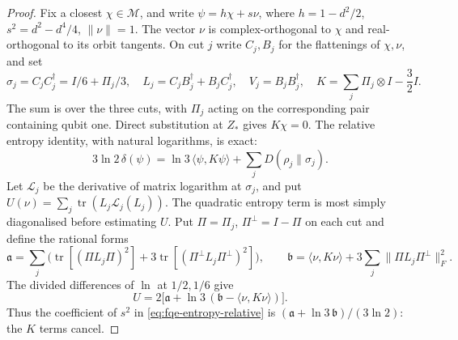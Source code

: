 \begin{proof}
Fix a closest $\chi\in\mathcal M$, and write
$\psi=h\chi+s\nu$, where $h=1-d^2/2$, $s^2=d^2-d^4/4$,
$\|\nu\|=1$. The vector $\nu$ is complex-orthogonal to $\chi$
and real-orthogonal to its orbit tangents. On cut $j$ write $C_j,B_j$
for the flattenings of $\chi,\nu$, and set
\[
 \sigma_j=C_jC_j^\dagger=I/6+\Pi_j/3,\quad
 L_j=C_jB_j^\dagger+B_jC_j^\dagger,\quad
 V_j=B_jB_j^\dagger,\quad
 K=\sum_j\Pi_j\otimes I-\frac32 I.
\]
The sum is over the three cuts, with $\Pi_j$ acting on the corresponding
pair containing qubit one. Direct substitution at $Z_*$ gives $K\chi=0$.
The relative entropy identity, with natural logarithms, is exact:
\begin{equation}\label{eq:fqe-entropy-relative}
 3\ln2\,\delta(\psi)=\ln3\,\langle\psi,K\psi\rangle
                         +\sum_jD(\rho_j\|\sigma_j).
\end{equation}
Let $\mathcal L_j$ be the derivative of matrix logarithm at $\sigma_j$,
and put $U(\nu)=\sum_j\operatorname{tr}(L_j\mathcal L_j(L_j))$.
The quadratic entropy term is most simply diagonalised before estimating
$U$. Put $\Pi=\Pi_j$, $\Pi^\perp=I-\Pi$ on each cut and define the rational forms
\[
 \mathfrak a=\sum_j\bigl(\operatorname{tr}[(\Pi L_j\Pi)^2]
                         +3\operatorname{tr}[(\Pi^\perp L_j\Pi^\perp)^2]\bigr),\qquad
 \mathfrak b=\langle\nu,K\nu\rangle
                         +3\sum_j\|\Pi L_j\Pi^\perp\|_F^2.
\]
The divided differences of $\ln$ at $1/2,1/6$ give
\[
 U=2\bigl[\mathfrak a+\ln3\,(\mathfrak b-\langle\nu,K\nu\rangle)\bigr].
\]
Thus the coefficient of $s^2$ in \eqref{eq:fqe-entropy-relative} is
$(\mathfrak a+\ln3\,\mathfrak b)/(3\ln2)$: the $K$ terms cancel.


\end{proof}

